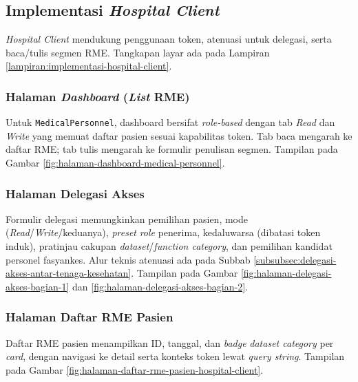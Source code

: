 \subsection{Implementasi \textit{Hospital Client}}
\label{subsec:implementasi-hospital-client}

\textit{Hospital Client} mendukung penggunaan token, atenuasi untuk delegasi, serta baca/tulis segmen RME. Tangkapan layar ada pada Lampiran \ref{lampiran:implementasi-hospital-client}.

\subsubsection{Halaman \textit{Dashboard} (\textit{List} RME)}
\label{subsubsec:halaman-dashboard-hospital-client}

Untuk \texttt{MedicalPersonnel}, dashboard bersifat \textit{role-based} dengan tab \textit{Read} dan \textit{Write} yang memuat daftar pasien sesuai kapabilitas token. Tab baca mengarah ke daftar RME; tab tulis mengarah ke formulir penulisan segmen. Tampilan pada Gambar \ref{fig:halaman-dashboard-medical-personnel}.

\subsubsection{Halaman Delegasi Akses}
\label{subsubsec:halaman-delegasi-akses-hospital-client}

Formulir delegasi memungkinkan pemilihan pasien, mode (\textit{Read}/\textit{Write}/keduanya), \textit{preset} \textit{role} penerima, kedaluwarsa (dibatasi token induk), pratinjau cakupan \textit{dataset}/\textit{function category}, dan pemilihan kandidat personel fasyankes. Alur teknis atenuasi ada pada Subbab \ref{subsubsec:delegasi-akses-antar-tenaga-kesehatan}. Tampilan pada Gambar \ref{fig:halaman-delegasi-akses-bagian-1} dan \ref{fig:halaman-delegasi-akses-bagian-2}.

\subsubsection{Halaman Daftar RME Pasien}
\label{subsubsec:halaman-daftar-emr-pasien-hospital-client}

Daftar RME pasien menampilkan ID, tanggal, dan \textit{badge} \textit{dataset category} per \textit{card}, dengan navigasi ke detail serta konteks token lewat \textit{query string}. Tampilan pada Gambar \ref{fig:halaman-daftar-rme-pasien-hospital-client}.

